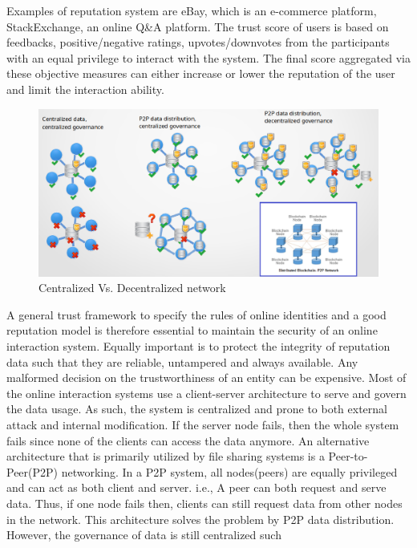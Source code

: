 Examples of reputation system are eBay, which is an e-commerce platform,
StackExchange, an online Q&A platform. The trust score of users is based on
feedbacks, positive/negative ratings, upvotes/downvotes from the participants
with an equal privilege to interact with the system. The final score aggregated
via these objective measures can either increase or lower the reputation of the
user and limit the interaction ability.\\
\begin{figure}
	\begin{center}
		\includegraphics[width=1.0\textwidth]{Images/WhyBlockchain.eps}
		\caption{Centralized Vs. Decentralized network}
		\label{fig:WhyBlockchain}
	\end{center}
\end{figure}
A general trust framework to specify the rules of online identities and a good
reputation model is therefore essential to maintain the security of an online
interaction system. Equally important is to protect the integrity of reputation
data such that they are reliable, untampered and always available. Any
malformed decision on the trustworthiness of an entity can be expensive. Most
of the online interaction systems use a client-server architecture to serve and
govern the data usage. As such, the system is centralized and prone to both
external attack and internal modification. If the server node fails, then the
whole system fails since none of the clients can access the data anymore. An
alternative architecture that is primarily utilized by file sharing systems is
a Peer-to-Peer(P2P) networking. In a P2P system, all nodes(peers) are equally
privileged and can act as both client and server. i.e., A peer can both request
and serve data. Thus, if one node fails then, clients can still request data
from other nodes in the network. This architecture solves the problem by P2P
data distribution. However, the governance of data is still centralized such
